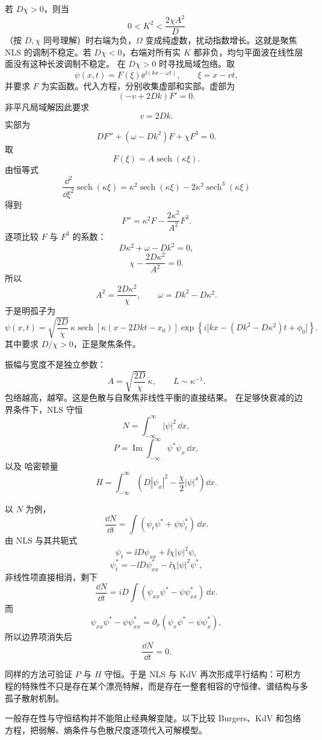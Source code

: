 若 $D\chi>0$，则当
\[
0<K^2<\frac{2\chi A^2}{D}
\]
（按 $D,\chi$ 同号理解）时右端为负，$\Omega$ 变成纯虚数，扰动指数增长。这就是聚焦 NLS 的调制不稳定。若 $D\chi<0$，右端对所有实 $K$ 都非负，均匀平面波在线性层面没有这种长波调制不稳定。
在 $D\chi>0$ 时寻找局域包络。取
\[
\psi(x,t)=F(\xi)\ee^{\ii (kx-\omega t)},
\qquad
\xi=x-vt,
\]
并要求 $F$ 为实函数。代入方程，分别收集虚部和实部。虚部为
\[
(-v+2Dk)F'=0.
\]
非平凡局域解因此要求
\begin{equation*}{v=2Dk}.\end{equation*}
实部为
\[
D F''+(\omega-Dk^2)F+\chi F^3=0.
\]
取
\[
F(\xi)=A\operatorname{sech}(\kappa\xi).
\]
由恒等式
\[
\frac{\dd^2}{\dd\xi^2}\operatorname{sech}(\kappa\xi)
=\kappa^2\operatorname{sech}(\kappa\xi)
-2\kappa^2\operatorname{sech}^3(\kappa\xi)
\]
得到
\[
F''=\kappa^2F-\frac{2\kappa^2}{A^2}F^3.
\]
逐项比较 $F$ 与 $F^3$ 的系数：
\[
D\kappa^2+\omega-Dk^2=0,
\]
\[
\chi-\frac{2D\kappa^2}{A^2}=0.
\]
所以
\[
A^2=\frac{2D\kappa^2}{\chi},
\qquad
\omega=Dk^2-D\kappa^2.
\]
于是明孤子为
\begin{equation*}{
\psi(x,t)
=\sqrt{\frac{2D}{\chi}}\,\kappa
\operatorname{sech}[\kappa(x-2Dkt-x_0)]
\exp\!\left\{
i\bigl[kx-(Dk^2-D\kappa^2)t+\phi_0\bigr]
\right\}
}.\end{equation*}
其中要求 $D/\chi>0$，正是聚焦条件。

振幅与宽度不是独立参数：
\[
A=\sqrt{\frac{2D}{\chi}}\,\kappa,
\qquad
L\sim\kappa^{-1}.
\]
包络越高，越窄。这是色散与自聚焦非线性平衡的直接结果。
在足够快衰减的边界条件下，NLS 守恒
\[
N=\int_{-\infty}^{\infty}|\psi|^2\,\dd x,
\]
\[
P=\operatorname{Im}
\int_{-\infty}^{\infty}\psi^*\psi_x\,\dd x,
\]
以及 哈密顿量
\begin{equation*}{
H=\int_{-\infty}^{\infty}
\left(
D|\psi_x|^2-\frac{\chi}{2}|\psi|^4
\right)\dd x
}.\end{equation*}

以 $N$ 为例，
\[
\frac{\dd N}{\dd t}
=\int(\psi_t\psi^*+\psi\psi_t^*)\,\dd x.
\]
由 NLS 与其共轭式
\[
\psi_t=\ii D\psi_{xx}+\ii\chi|\psi|^2\psi,
\]
\[
\psi_t^*=-\ii D\psi_{xx}^*-\ii\chi|\psi|^2\psi^*,
\]
非线性项直接相消，剩下
\[
\frac{\dd N}{\dd t}
=iD\int(\psi_{xx}\psi^*-\psi\psi_{xx}^*)\,\dd x.
\]
而
\[
\psi_{xx}\psi^*-\psi\psi_{xx}^*
=\partial_x(\psi_x\psi^*-\psi\psi_x^*),
\]
所以边界项消失后
\[
{\frac{\dd N}{\dd t}=0}.
\]

同样的方法可验证 $P$ 与 $H$ 守恒。于是 NLS 与 KdV 再次形成平行结构：可积方程的特殊性不只是存在某个漂亮特解，而是存在一整套相容的守恒律、谱结构与多孤子散射机制。


一般存在性与守恒结构并不能阻止经典解变陡。以下比较 Burgers、KdV 和包络方程，把弱解、熵条件与色散尺度逐项代入可解模型。






